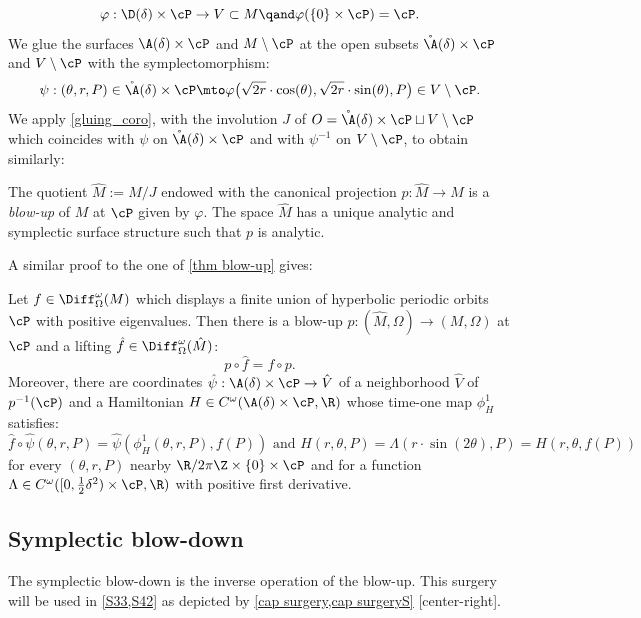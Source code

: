 \[\varphi: \D(\delta)\times \cP \to V\subset M\qand \varphi(\{0\}\times \cP)=\cP.\]
We glue the surfaces
$ \A(\delta)\times \cP$ and
$ M\setminus \cP$ at the open subsets $ \mathring\A(\delta)\times \cP $ and $V \setminus \cP$ with
the symplectomorphism:
\begin{equation} \label{eq psi2}\psi: (\theta,r,P)\in\mathring\A(\delta) \times \cP \mto \varphi\bigl(\sqrt{2r } \cdot \cos (\theta), \sqrt{2r }\cdot \sin (\theta),P\bigr)\in V \setminus \cP.\end{equation}
We apply \cref{gluing_coro}, with the involution $J$ of $O=\mathring\A(\delta)\times \cP\sqcup
V \setminus \cP$ which coincides with $\psi$ on $\mathring\A(\delta)\times \cP$ and with $\psi^{-1}$ on $V \setminus \cP$, to obtain similarly:
\begin{definition}\label{def blow-up2} The quotient $\hat M:= M/ J$ endowed with the canonical projection $p:
\hat M\to M$ is a \emph{blow-up} of $M$ at $\cP$ given by $\varphi$. The space $\hat M$ has a unique analytic and symplectic surface structure such that $p$ is analytic. \end{definition}
A similar proof to the one of \cref{thm blow-up} gives:
\begin{theorem}\label{thm blow-up2}
Let $f\in \Diff^\omega_\Omega(M)$ which displays a finite union of hyperbolic periodic orbits $\cP$ with positive eigenvalues.
Then there is a blow-up $p: (\hat M, \Omega)\to (M,\Omega)$ at $\cP$ and a lifting $\hat f\in \Diff^\omega_\Omega(\hat M)$:
\[p\circ \hat f= f\circ p.\]
Moreover, there are coordinates $\hat \psi: \A(\delta)\times \cP \to \hat V$ of a neighborhood $\hat V$ of $p^{-1}(\cP)$ and a Hamiltonian $H\in C^\omega (\A(\delta)\times \cP, \R)$ whose time-one map $\phi_H^1$ satisfies:
\[\hat f \circ \hat \psi (\theta, r,P) = \hat \psi(\phi_H^1(\theta,r,P), f(P))\text{ and } H (r,\theta,P)= \Lambda (r \cdot \sin(2\theta),P)= H(r,\theta, f(P)) \]
for every $(\theta,r,P)$ nearby $\R/2\pi \Z\times \{0\}\times \cP$
and for a function $\Lambda\in C^\omega([0,\tfrac12 \delta^2) \times \cP,\R)$ with positive first derivative.
\end{theorem}
\subsection{Symplectic blow-down}\label{S25}
The symplectic blow-down is the inverse operation of the blow-up. This surgery will be used in \cref{S33,S42} as depicted by \cref{cap surgery,cap surgeryS} [center-right].

